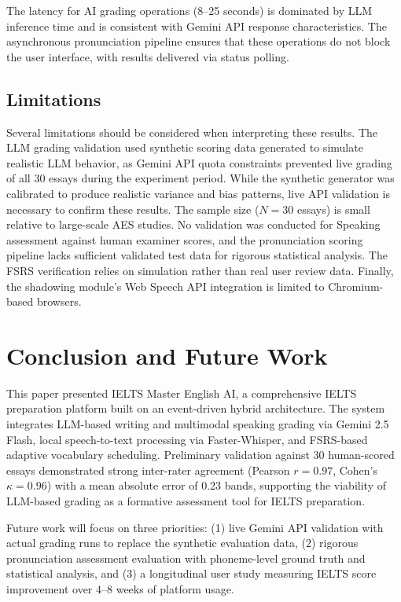 \documentclass[conference]{IEEEtran}
\begin{document}
The latency for AI grading operations (8--25 seconds) is dominated by LLM inference time and is consistent with Gemini API response characteristics. The asynchronous pronunciation pipeline ensures that these operations do not block the user interface, with results delivered via status polling.

\subsection{Limitations}

Several limitations should be considered when interpreting these results. The LLM grading validation used synthetic scoring data generated to simulate realistic LLM behavior, as Gemini API quota constraints prevented live grading of all 30 essays during the experiment period. While the synthetic generator was calibrated to produce realistic variance and bias patterns, live API validation is necessary to confirm these results. The sample size ($N=30$ essays) is small relative to large-scale AES studies. No validation was conducted for Speaking assessment against human examiner scores, and the pronunciation scoring pipeline lacks sufficient validated test data for rigorous statistical analysis. The FSRS verification relies on simulation rather than real user review data. Finally, the shadowing module's Web Speech API integration is limited to Chromium-based browsers.

\section{Conclusion and Future Work}

This paper presented IELTS Master English AI, a comprehensive IELTS preparation platform built on an event-driven hybrid architecture. The system integrates LLM-based writing and multimodal speaking grading via Gemini 2.5 Flash, local speech-to-text processing via Faster-Whisper, and FSRS-based adaptive vocabulary scheduling. Preliminary validation against 30 human-scored essays demonstrated strong inter-rater agreement (Pearson $r=0.97$, Cohen's $\kappa=0.96$) with a mean absolute error of 0.23 bands, supporting the viability of LLM-based grading as a formative assessment tool for IELTS preparation.

Future work will focus on three priorities: (1) live Gemini API validation with actual grading runs to replace the synthetic evaluation data, (2) rigorous pronunciation assessment evaluation with phoneme-level ground truth and statistical analysis, and (3) a longitudinal user study measuring IELTS score improvement over 4--8 weeks of platform usage.
\end{document}
